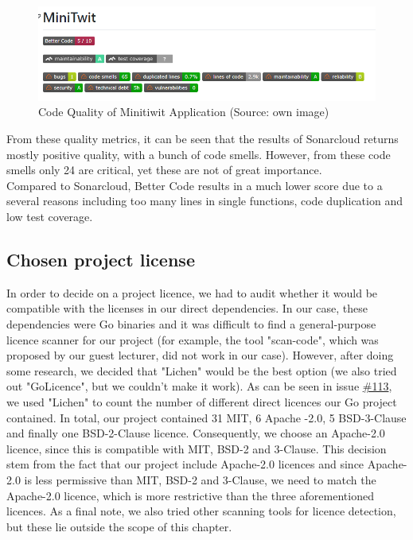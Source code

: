 \begin{figure}[!ht]
    \centering
    \captionsetup{justification=centering,margin=1cm}
    \includegraphics[width=\linewidth]{images/code_quality.png}
    \caption{Code Quality of Minitiwit Application (Source: own image)}
    \label{fig:CodeQuality}
\end{figure}
From these quality metrics, it can be seen that the results of Sonarcloud returns mostly positive quality, with a bunch of code smells. However, from these code smells only 24 are critical, yet these are not of great importance. \\
Compared to Sonarcloud, Better Code results in a much lower score due to a several reasons including too many lines in single functions, code duplication and low test coverage.

\subsection{Chosen project license}
In order to decide on a project licence, we had to audit whether it would be compatible with the licenses in our direct dependencies. In our case, these dependencies were Go binaries and it was difficult to find a general-purpose licence scanner for our project (for example, the tool "scan-code", which was proposed by our guest lecturer, did not work in our case). However, after doing some research, we decided that "Lichen" would be the best option (we also tried out "GoLicence", but we couldn't make it work). As can be seen in issue \href{https://github.com/DevelOpsITU/MiniTwit/issues/134}{\#113}, we used "Lichen" to count the number of different direct licences our Go project contained. In total, our project contained 31 MIT, 6 Apache -2.0, 5 BSD-3-Clause and finally one BSD-2-Clause licence. Consequently, we choose an Apache-2.0 licence, since this is compatible with MIT, BSD-2 and 3-Clause. This decision stem from the fact that our project include Apache-2.0 licences and since Apache-2.0 is less permissive than MIT, BSD-2 and 3-Clause, we need to match the Apache-2.0 licence, which is more restrictive than the three aforementioned licences. As a final note, we also tried other scanning tools for licence detection, but these lie outside the scope of this chapter.



